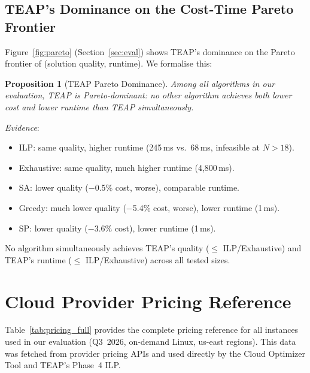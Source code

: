 \documentclass[10pt,journal]{IEEEtran}
\newtheorem{proposition}[theorem]{Proposition}
\begin{document}
\subsection{TEAP's Dominance on the Cost-Time Pareto Frontier}

Figure~\ref{fig:pareto} (Section~\ref{sec:eval}) shows TEAP's dominance
on the Pareto frontier of (solution quality, runtime).
We formalise this:

\begin{proposition}[TEAP Pareto Dominance]\label{prop:pareto}
Among all algorithms in our evaluation, TEAP is Pareto-dominant: no other
algorithm achieves both lower cost and lower runtime than TEAP simultaneously.
\end{proposition}

\textit{Evidence}:
\begin{itemize}[leftmargin=*,noitemsep]
  \item ILP: same quality, higher runtime (245\,ms vs.\ 68\,ms, infeasible at $N>18$).
  \item Exhaustive: same quality, much higher runtime (4{,}800\,ms).
  \item SA: lower quality ($-$0.5\% cost, worse), comparable runtime.
  \item Greedy: much lower quality ($-$5.4\% cost, worse), lower runtime (1\,ms).
  \item SP: lower quality ($-$3.6\% cost), lower runtime (1\,ms).
\end{itemize}

No algorithm simultaneously achieves TEAP's quality ($\leq$ ILP/Exhaustive) and
TEAP's runtime ($\leq$ ILP/Exhaustive) across all tested sizes.



\appendix
\section{Cloud Provider Pricing Reference}\label{app:pricing}

Table~\ref{tab:pricing_full} provides the complete pricing reference for all
instances used in our evaluation (Q3~2026, on-demand Linux, us-east regions).
This data was fetched from provider pricing APIs and used directly by the
Cloud Optimizer Tool and TEAP's Phase~4 ILP.
\end{document}

